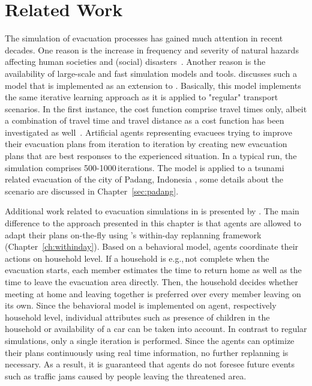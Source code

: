 \section{Related Work}
The simulation of evacuation processes has gained much attention in recent decades. One reason is the increase in frequency and severity of natural hazards affecting human societies and (social) disasters~\citep{Rodr2006HBoDisasterResearch}. Another reason is the availability of large-scale and fast simulation models and tools. \citet{Laemmel_PhDThesis_2011} discusses such a model that is implemented as an extension to . Basically, this model implements the same iterative learning approach as it is applied to "regular" transport scenarios. In the first instance, the cost function comprise travel times only, albeit a combination of travel time and travel distance as a cost function has been investigated as well~\citep{LaemmelKluepfelNagel2009EvacPadangAtBookTimmermanns}. 
Artificial agents representing evacuees trying to improve their evacuation plans from iteration to iteration by creating new evacuation plans that are best responses to the experienced situation. 
In a typical run, the simulation comprises 500-1000\,iterations. 
The model is applied to a tsunami related evacuation of the city of Padang, Indonesia \citep[e.g.,][]{TaubenboeckEtAl2012ConcludingLastMilePaperNatHazards,GosebergEtAl2012LastLastMile}, some details about the scenario are discussed in Chapter~\ref{sec:padang}. 

Additional work related to evacuation simulations in  is presented by \citet{Dobler_PhDThesis_2013}. The main difference to the approach presented in this chapter is that agents are allowed to adapt their plans on-the-fly using 's within-day replanning framework \citep{DoblerEtAl_TRR_2012} (Chapter~\ref{ch:withinday}). 
Based on a behavioral model, agents coordinate their actions on household level. If a household is e.g.,\,not complete when the evacuation starts, each member estimates the time to return home as well as the time to leave the evacuation area directly. Then, the household decides whether meeting at home and leaving together is preferred over every member leaving on its own.
Since the behavioral model is implemented on agent, respectively household level, individual attributes such as presence of children in the household or availability of a car can be taken into account.
In contrast to regular  simulations, only a single iteration is performed. Since the agents can optimize their plans continuously using real time information, no further replanning is necessary. As a result, it is guaranteed that agents do not foresee future events such as traffic jams caused by people leaving the threatened area.

